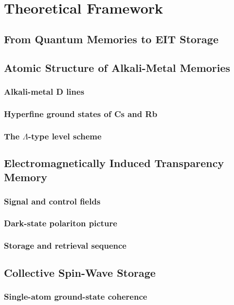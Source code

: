\chapter{Theoretical Framework}

\section{From Quantum Memories to EIT Storage}

\section{Atomic Structure of Alkali-Metal Memories}
\subsection{Alkali-metal D lines}
\subsection{Hyperfine ground states of Cs and Rb}
\subsection{The $\Lambda$-type level scheme}

\section{Electromagnetically Induced Transparency Memory}
\subsection{Signal and control fields}
\subsection{Dark-state polariton picture}
\subsection{Storage and retrieval sequence}

\section{Collective Spin-Wave Storage}
\subsection{Single-atom ground-state coherence}
